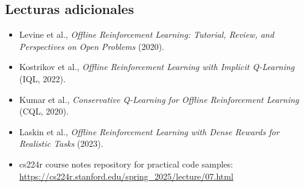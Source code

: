 \documentclass[a4paper]{article}
\begin{document}
\subsection{Lecturas adicionales}
\begin{itemize}
    \item Levine et al., \textit{Offline Reinforcement Learning: Tutorial, Review, and Perspectives on Open Problems} (2020).
    \item Kostrikov et al., \textit{Offline Reinforcement Learning with Implicit Q-Learning} (IQL, 2022).
    \item Kumar et al., \textit{Conservative Q-Learning for Offline Reinforcement Learning} (CQL, 2020).
    \item Laskin et al., \textit{Offline Reinforcement Learning with Dense Rewards for Realistic Tasks} (2023).
    \item cs224r course notes repository for practical code samples: \url{https://cs224r.stanford.edu/spring_2025/lecture/07.html}
\end{itemize}
\end{document}
